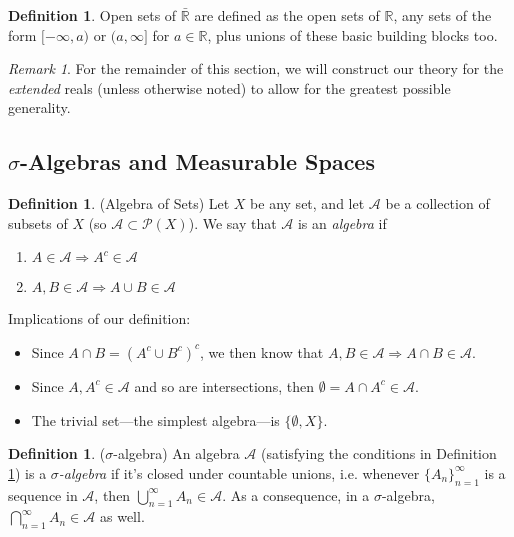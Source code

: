 \documentclass[12pt]{article}
\theoremstyle{plain}
\theoremstyle{definition}
\newtheorem{defn}[thm]{Definition}
\theoremstyle{remark}
\newtheorem*{rmk}{Remark}
\begin{document}
\begin{defn}
Open sets of $\bar{\mathbb{R}}$ are defined as the open sets of $\mathbb{R}$, any sets of the form $[-\infty, a)$ or $(a,\infty]$ for $a\in\mathbb{R}$, plus unions of these basic building blocks too.
\end{defn}

\begin{rmk}
For the remainder of this section, we will construct our theory for the \emph{extended} reals (unless otherwise noted) to allow for the greatest possible generality.
\end{rmk}

\subsection{$\sigma$-Algebras and Measurable Spaces}

\begin{defn} 
\label{algebra}
(Algebra of Sets)
Let $X$ be any set, and let $\mathscr{A}$ be a collection of subsets of $X$ (so $\mathscr{A}\subset\mathscr{P}(X)$). We say that $\mathscr{A}$ is an \emph{algebra} if 
\begin{enumerate}
    \item $A\in\mathscr{A}\Rightarrow A^c\in\mathscr{A}$
    \item $A,B\in\mathscr{A} \Rightarrow A\cup B\in\mathscr{A}$
\end{enumerate}
Implications of our definition:
\begin{itemize}
    \item Since $A\cap B = (A^c \cup B^c)^c$, we then know that $A,B\in\mathscr{A}\Rightarrow A\cap B\in \mathscr{A}$.
    \item Since $A, A^c \in \mathscr{A}$ and so are intersections, then $\emptyset = A\cap A^c \in \mathscr{A}$.
    \item The trivial set---the simplest algebra---is $\{\emptyset, X\}$.
\end{itemize}
\end{defn}

\begin{defn} 
($\sigma$-algebra)
An algebra $\mathscr{A}$ (satisfying the conditions in Definition \ref{algebra}) is a \emph{$\sigma$-algebra} if it's closed under countable unions,  i.e. whenever $\{A_n\}^\infty_{n=1}$ is a sequence in $\mathscr{A}$, then $\bigcup^\infty_{n=1} A_n \in \mathscr{A}$. As a consequence, in a $\sigma$-algebra, $\bigcap^\infty_{n=1} A_n \in \mathscr{A}$ as well.
\end{defn}
\end{document}
